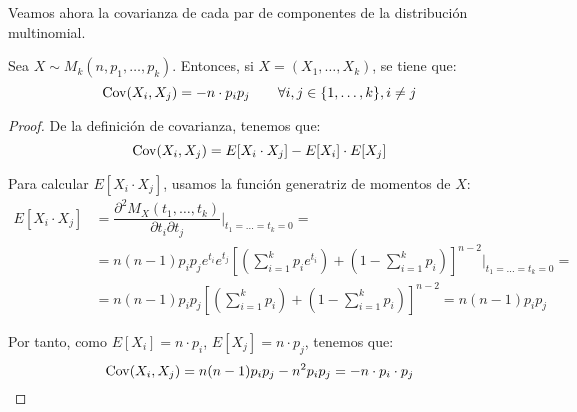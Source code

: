 Veamos ahora la covarianza de cada par de componentes de la distribución multinomial.
\begin{prop}
    Sea $X\sim M_k(n, p_1, \ldots, p_k)$. Entonces, si $X=(X_1, \ldots, X_k)$, se tiene que:
    \begin{equation*}
        \operatorname{Cov}(X_i, X_j)=-n\cdot p_i p_j \qquad \forall i,j\in \{1, \ldots, k\}, i\neq j
    \end{equation*}
\end{prop}
\begin{proof}
    De la definición de covarianza, tenemos que:
    \begin{equation*}
        \operatorname{Cov}(X_i, X_j)=E[X_i\cdot X_j]-E[X_i]\cdot E[X_j]
    \end{equation*}

    Para calcular $E[X_i\cdot X_j]$, usamos la función generatriz de momentos de $X$:
    \begin{align*}
        E[X_i\cdot X_j]&=\dfrac{\partial^2 M_X(t_1, \ldots, t_k)}{\partial t_i\partial t_j}\Bigg|_{t_1=\ldots=t_k=0}
        =\\&= n(n-1)p_ip_je^{t_i}e^{t_j}\left[\left(\sum_{i=1}^k p_i e^{t_i}\right)+\left(1-\sum_{i=1}^k p_i\right)\right]^{n-2}\Bigg|_{t_1=\ldots=t_k=0}
        =\\&= n(n-1)p_ip_j\left[\left(\sum_{i=1}^k p_i\right)+\left(1-\sum_{i=1}^k p_i\right)\right]^{n-2}
        = n(n-1)p_ip_j
    \end{align*}

    Por tanto, como $E[X_i]=n\cdot p_i$, $E[X_j]=n\cdot p_j$, tenemos que:
    \begin{equation*}
        \operatorname{Cov}(X_i, X_j)=n(n-1)p_ip_j-n^2p_ip_j=-n\cdot p_i\cdot p_j
    \end{equation*}
\end{proof}